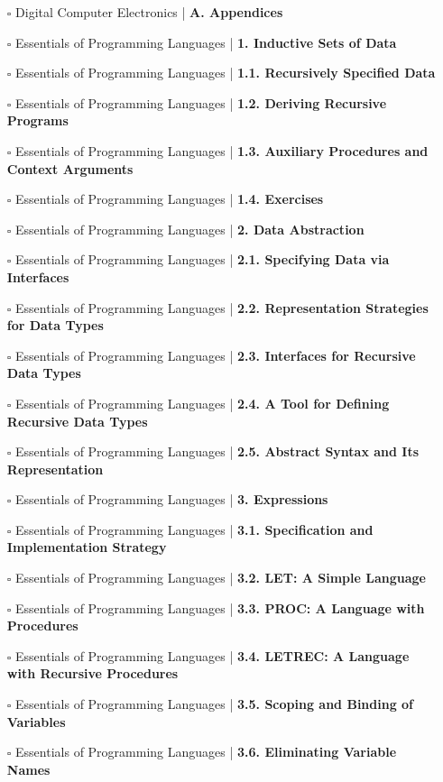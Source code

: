 \documentclass[a4, landscape, 12pt]{article}
\newcommand{\checkbox}{$\square$}%
\begin{document}
\begin{itemize}
{}
\item [\checkbox]  Digital Computer Electronics | \textbf{ A. Appendices
}
\item [\checkbox]  Essentials of Programming Languages | \textbf{ 1. Inductive Sets of Data
}
\item [\checkbox]  Essentials of Programming Languages | \textbf{ 1.1. Recursively Specified Data
}
\item [\checkbox]  Essentials of Programming Languages | \textbf{ 1.2. Deriving Recursive Programs
}
\item [\checkbox]  Essentials of Programming Languages | \textbf{ 1.3. Auxiliary Procedures and Context Arguments
}
\item [\checkbox]  Essentials of Programming Languages | \textbf{ 1.4. Exercises
}
\item [\checkbox]  Essentials of Programming Languages | \textbf{ 2. Data Abstraction
}
\item [\checkbox]  Essentials of Programming Languages | \textbf{ 2.1. Specifying Data via Interfaces
}
\item [\checkbox]  Essentials of Programming Languages | \textbf{ 2.2. Representation Strategies for Data Types
}
\item [\checkbox]  Essentials of Programming Languages | \textbf{ 2.3. Interfaces for Recursive Data Types
}
\item [\checkbox]  Essentials of Programming Languages | \textbf{ 2.4. A Tool for Defining Recursive Data Types
}
\item [\checkbox]  Essentials of Programming Languages | \textbf{ 2.5. Abstract Syntax and Its Representation
}
\item [\checkbox]  Essentials of Programming Languages | \textbf{ 3. Expressions
}
\item [\checkbox]  Essentials of Programming Languages | \textbf{ 3.1. Specification and Implementation Strategy
}
\item [\checkbox]  Essentials of Programming Languages | \textbf{ 3.2. LET: A Simple Language
}
\item [\checkbox]  Essentials of Programming Languages | \textbf{ 3.3. PROC: A Language with Procedures
}
\item [\checkbox]  Essentials of Programming Languages | \textbf{ 3.4. LETREC: A Language with Recursive Procedures
}
\item [\checkbox]  Essentials of Programming Languages | \textbf{ 3.5. Scoping and Binding of Variables
}
\item [\checkbox]  Essentials of Programming Languages | \textbf{ 3.6. Eliminating Variable Names
}
\end{itemize}
\end{document}
